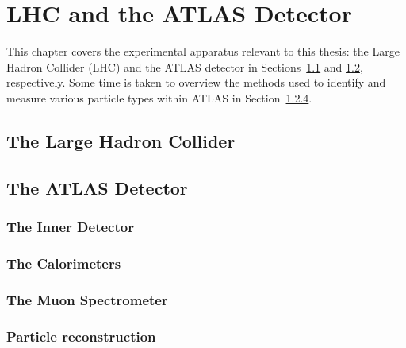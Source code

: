 \chapter[LHC and the ATLAS Detector][LHC and the ATLAS Detector]{LHC and the ATLAS Detector}
\label{ch:detector}
This chapter covers the experimental apparatus relevant to this thesis: the Large Hadron Collider (LHC) and the ATLAS detector in Sections~\ref{sec:lhc} and \ref{sec:atlas}, respectively.
Some time is taken to overview the methods used to identify and measure various particle types within ATLAS in Section~\ref{sec:reconstruction}.

\section{The Large Hadron Collider}\label{sec:lhc}


\section{The ATLAS Detector}\label{sec:atlas}


\subsection{The Inner Detector}\label{sec:id}


\subsection{The Calorimeters}\label{sec:calorimeters}


\subsection{The Muon Spectrometer}\label{sec:muon_spectrometer}


\subsection{Particle reconstruction}\label{sec:reconstruction}

